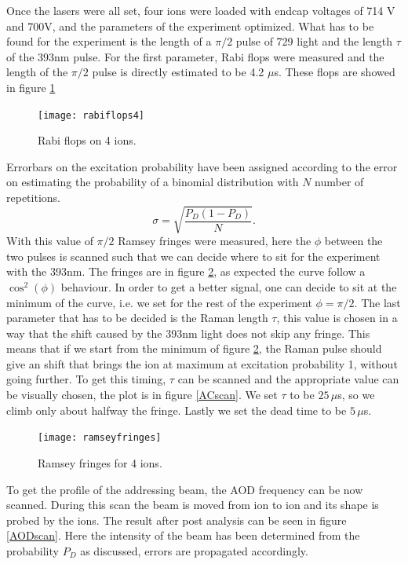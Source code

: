 Once the lasers were all set, four ions were loaded with endcap voltages of 714 V and 700V, and the parameters of the experiment optimized. What has to be found for the experiment is the length of a $\pi/2$ pulse of 729 light and the length $\tau$ of the 393nm pulse. For the first parameter, Rabi flops were measured and the length of the $\pi/2$ pulse is directly estimated to be 4.2 $\mu$s. These flops are showed in figure \ref{rabiflops4}
\begin{figure}[H]
\centering
\texttt{[image: rabiflops4]}
\caption{Rabi flops on 4 ions.}
\label{rabiflops4}
\end{figure}
Errorbars on the excitation probability have been assigned according to the error on estimating the probability of a binomial distribution with $N$ number of repetitions.
\begin{equation}
\sigma = \sqrt{\frac{P_{D}(1-P_{D})}{N}}.
\end{equation}
With this value of $\pi/2$ Ramsey fringes were measured, here the $\phi$ between the two pulses is scanned such that we can decide where to sit for the experiment with the 393nm.
The fringes are in figure \ref{ramseyfringes}, as expected the curve follow a $\cos^2(\phi)$ behaviour. In order to get a better signal, one can decide to sit at the minimum of the curve, i.e. we set for the rest of the experiment $\phi = \pi/2$. The last parameter that has to be decided is the Raman length $\tau$, this value is chosen in a way that the shift caused by the 393nm light does not skip any fringe. This means that if we start from the minimum of figure \ref{ramseyfringes}, the Raman pulse should give an shift that brings the ion at maximum at excitation probability 1, without going further. To get this timing, $\tau$ can be scanned and the appropriate value can be visually chosen, the plot is in figure \ref{ACscan}. We set $\tau$ to be $25\,\mu$s, so we climb only about halfway the fringe. Lastly we set the dead time to be $5\,\mu$s.
\begin{figure}[H]
\centering
\texttt{[image: ramseyfringes]}
\caption{Ramsey fringes for 4 ions.}
\label{ramseyfringes}
\end{figure}
To get the profile of the addressing beam, the AOD frequency can be now scanned. During this scan the beam is moved from ion to ion and its shape is probed by the ions. The result
after post analysis can be seen in figure \ref{AODscan}. Here the intensity of the beam has been determined from the probability $P_D$ as discussed, errors are propagated accordingly.
